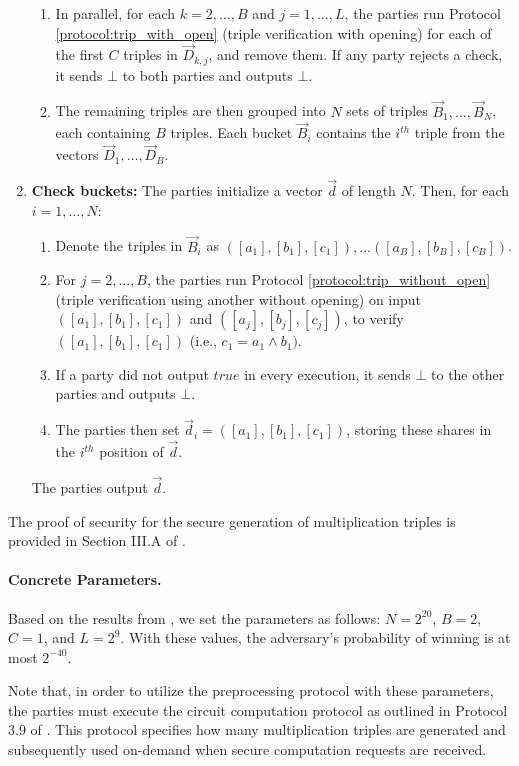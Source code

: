 \begin{protocol}
\begin{enumerate}
\begin{enumerate}
            \item In parallel, for each $k = 2, \ldots, B$ and $j = 1, \ldots, L$, the parties run Protocol \ref{protocol:trip_with_open} (triple verification with opening) for each of the first $C$ triples in $\vec{D}_{k, j}$, and remove them. If any party rejects a check, it sends $\bot$ to both parties and outputs $\bot$.
            \item The remaining triples are then grouped into $N$ sets of triples $\vec{B}_1, \ldots, \vec{B}_N$, each containing $B$ triples. Each bucket $\vec{B}_i$ contains the $i^{th}$ triple from the vectors $\vec{D}_1, \ldots, \vec{D}_B$.
        \end{enumerate}
        \item {\bf Check buckets:} The parties initialize a vector $\vec{d}$ of length $N$. Then, for each $i = 1, \ldots, N$:
        \begin{enumerate}
            \item Denote the triples in $\vec{B}_i$ as $([a_1], [b_1], [c_1]), \ldots ([a_B], [b_B], [c_B])$.
            \item For $j = 2, \ldots, B$, the parties run Protocol \ref{protocol:trip_without_open} (triple verification using another without opening) on input $([a_1], [b_1], [c_1])$ and $([a_j], [b_j], [c_j])$, to verify $([a_1], [b_1], [c_1])$ (i.e., $c_1 = a_1 \wedge b_1)$.
            \item If a party did not output $true$ in every execution, it sends $\bot$ to the other parties and outputs $\bot$.
            \item The parties then set $\vec{d}_i = ([a_1], [b_1], [c_1])$, storing these shares in the $i^{th}$ position of $\vec{d}$.
        \end{enumerate}
        The parties output $\vec{d}$.
    \end{enumerate}
\end{protocol}

The proof of security for the secure generation of multiplication triples is provided in Section III.A of \cite{SP:ABFLLN17}.
\paragraph{\bf Concrete Parameters.} Based on the results from \cite{SP:ABFLLN17}, we set the parameters as follows: $N = 2^{20}$, $B = 2$, $C = 1$, and $L = 2^{9}$.
With these values, the adversary's probability of winning is at most $2^{-40}$.

Note that, in order to utilize the preprocessing protocol with these parameters, the parties must execute the circuit computation protocol as outlined in Protocol 3.9 of \cite{SP:ABFLLN17}. This protocol specifies how many multiplication triples are generated and subsequently used on-demand when secure computation requests are received.

